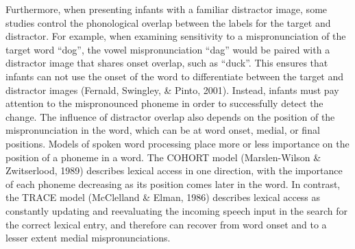 \documentclass[man]{apa6}
\theoremstyle{definition}
\theoremstyle{definition}
\theoremstyle{definition}
\theoremstyle{remark}
\begin{document}
Furthermore, when presenting infants with a familiar distractor image,
some studies control the phonological overlap between the labels for the
target and distractor. For example, when examining sensitivity to a
mispronunciation of the target word \enquote{dog}, the vowel
mispronunciation \enquote{dag} would be paired with a distractor image
that shares onset overlap, such as \enquote{duck}. This ensures that
infants can not use the onset of the word to differentiate between the
target and distractor images (Fernald, Swingley, \& Pinto, 2001).
Instead, infants must pay attention to the mispronounced phoneme in
order to successfully detect the change. The influence of distractor
overlap also depends on the position of the mispronunciation in the
word, which can be at word onset, medial, or final positions. Models of
spoken word processing place more or less importance on the position of
a phoneme in a word. The COHORT model (Marslen-Wilson \& Zwitserlood,
1989) describes lexical access in one direction, with the importance of
each phoneme decreasing as its position comes later in the word. In
contrast, the TRACE model (McClelland \& Elman, 1986) describes lexical
access as constantly updating and reevaluating the incoming speech input
in the search for the correct lexical entry, and therefore can recover
from word onset and to a lesser extent medial mispronunciations.
\end{document}
